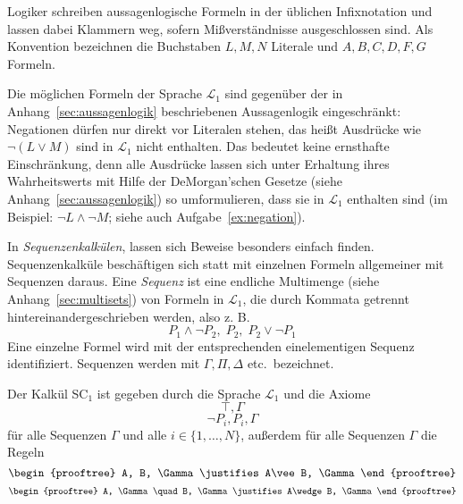 Logiker schreiben aussagenlogische Formeln in
der üblichen Infixnotation und lassen dabei Klammern weg, sofern
Mißverständnisse ausgeschlossen sind.
%
Als Konvention bezeichnen die Buchstaben $L, M, N$  Literale 
und $A, B, C, D, F, G$ Formeln.

Die möglichen Formeln der Sprache $\mathcal{L}_1$ sind gegenüber der
in Anhang~\ref{sec:aussagenlogik} beschriebenen Aussagenlogik eingeschränkt:
Negationen dürfen nur direkt vor Literalen stehen, das heißt Ausdrücke wie
$\neg(L\vee M)$ sind in $\mathcal{L}_1$ nicht enthalten.  Das bedeutet 
keine ernsthafte Einschränkung, denn alle Ausdrücke lassen sich unter Erhaltung 
ihres Wahrheitswerts
mit Hilfe der DeMorgan'schen Gesetze (siehe Anhang~\ref{sec:aussagenlogik})
so umformulieren, dass sie in $\mathcal{L}_1$ enthalten
sind (im Beispiel: $\neg L\wedge \neg M$; siehe auch
Aufgabe~\ref{ex:negation}). 

In \textit{Sequenzenkalkülen},
lassen sich Beweise besonders einfach finden.
Sequenzenkalküle beschäftigen sich statt mit einzelnen Formeln
allgemeiner mit Sequenzen daraus.
Eine \textit{Sequenz} ist eine endliche Multimenge
(siehe Anhang~\ref{sec:multisets}) von Formeln in
$\mathcal{L}_1$, die durch Kommata getrennt
hintereinandergeschrieben werden, also z. B.\
\[P_1\wedge\neg P_2,\; P_2,\; P_2\vee\neg P_1\] 
Eine einzelne Formel wird mit der entsprechenden einelementigen Sequenz
identifiziert.  
Sequenzen werden mit $\Gamma, \Pi, \Delta$ etc.\ bezeichnet.  


\begin{definition}[Kalkül SC$_1$]
Der Kalkül SC$_1$ ist gegeben durch die Sprache $\mathcal{L}_1$ und die
Axiome 
%
\begin{equation}
\top, \Gamma
\label{S1}
\end{equation}
\begin{equation}
\neg P_i, P_i, \Gamma
\label{S2}
\end{equation}
für alle Sequenzen $\Gamma$ und alle $i\in\{1,\ldots,N\}$, außerdem für alle
Sequenzen $\Gamma$ die Regeln
%
\begin{equation}
\begin{prooftree}
  A, B, \Gamma \justifies A\vee B, \Gamma
\end{prooftree}
\label{Sd}
\end{equation}
\begin{equation}
  \begin{prooftree}
    A, \Gamma \quad B, \Gamma \justifies A\wedge B, \Gamma
  \end{prooftree}
\label{Sc}
\end{equation}
%
\end{definition}

